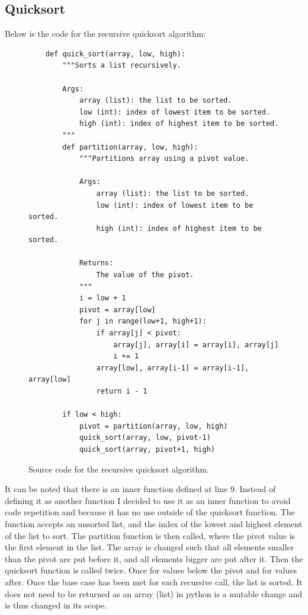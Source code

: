 \documentclass[twoside, 12pt]{report}
\begin{document}
\subsection{Quicksort}
Below is the code for the recursive quicksort algorithm:
\begin{figure}[H]
	\begin{verbatim}
	def quick_sort(array, low, high):
		"""Sorts a list recursively.
	
		Args:
			array (list): the list to be sorted.
			low (int): index of lowest item to be sorted.
			high (int): index of highest item to be sorted.
		"""
		def partition(array, low, high):
			"""Partitions array using a pivot value.
	
			Args:
				array (list): the list to be sorted.
				low (int): index of lowest item to be sorted.
				high (int): index of highest item to be sorted.
	
			Returns:
				The value of the pivot.
			"""
			i = low + 1
			pivot = array[low]
			for j in range(low+1, high+1):
				if array[j] < pivot:
					array[j], array[i] = array[i], array[j]
					i += 1
				array[low], array[i-1] = array[i-1], array[low]
				return i - 1
				
		if low < high:
			pivot = partition(array, low, high)
			quick_sort(array, low, pivot-1)
			quick_sort(array, pivot+1, high)
	\end{verbatim}
	\caption{Source code for the recursive quicksort algorithm.}
\end{figure}
It can be noted that there is an inner function defined at line 9. Instead of defining it as another function I decided to use it as an inner function to avoid code repetition and because it has no use outside of the quicksort function. The function accepts an unsorted list, and the index of the lowest and highest element of the list to sort. The partition function is then called, where the pivot value is the first element in the list. The array is changed such that all elements smaller than the pivot are put before it, and all elements bigger are put after it. Then the quicksort function is called twice. Once for values below the pivot and for values after. Once the base case has been met for each recursive call, the list is sorted. It does not need to be returned as an array (list) in python is a mutable change and is thus changed in its scope.
\end{document}
